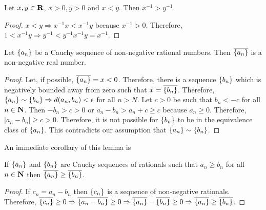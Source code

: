 \begin{lem}\label{c4s4l5}
Let $x, y \in \mathbf{R}$, $x > 0, y > 0$ and $x < y$. Then $x^{-1} > 
y^{-1}$.
\end{lem}
\begin{proof}
$x < y \Rightarrow x^{-1}x < x^{-1}y$ because $x^{-1} > 0$. Therefore,
$1 < x^{-1}y \Rightarrow y^{-1} < y^{-1}x^{-1}y = x^{-1}$.
\end{proof}

\begin{lem}\label{c4s4l6}
Let $\{a_n\}$ be a Cauchy sequence of non-negative rational numbers.
Then $\overline{\{a_n\}}$ is a non-negative real number.
\end{lem}
\begin{proof}
Let, if possible, $\overline{\{a_n\}} = x < 0$. Therefore, there is a
sequence $\{b_n\}$ which is negatively bounded away from zero such that
$x = \overline{\{b_n\}}$. Therefore, $\{a_n\} \sim \{b_n\} 
\Rightarrow d(a_n, b_n) < \epsilon$ for all $n > N$. Let $c > 0$ be 
such that $b_n < -c$ for all $n \in \mathbf{N}$. Then $-b_n > c > 0$ or $a_n
- b_n > a_n + c \ge c$ because $a_n \ge 0$. Therefore, $|a_n - b_n| \ge c
> 0$. Therefore, it is not possible for $\{b_n\}$ to be in the 
equivalence class of $\{a_n\}$. This contradicts our assumption that
$\{a_n\} \sim \{b_n\}$.
\end{proof}

An immediate corollary of this lemma is
\begin{cor}\label{c4s4c1}
If $\{a_n\}$ and $\{b_n\}$ are Cauchy sequences of rationals such
that $a_n \ge b_n$ for all $n \in \mathbf{N}$ then $\overline{\{a_n\}} \ge
\overline{\{b_n\}}$.
\end{cor}
\begin{proof}
If $c_n = a_n - b_n$ then $\{c_n\}$ is a sequence of non-negative
rationals. Therefore, $\overline{\{c_n\}} \ge 0 \Rightarrow \overline{
\{a_n - b_n\}} \ge 0 \Rightarrow \overline{\{a_n\}} - \overline{\{
b_n\}} \ge 0 \Rightarrow \overline{\{a_n\}} \ge \overline{\{b_n\}}$.
\end{proof}

